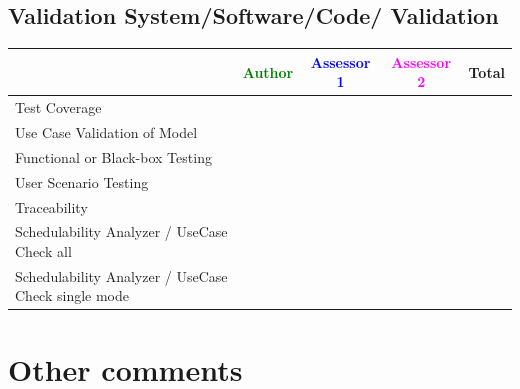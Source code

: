 	
\subsection{Validation System/Software/Code/ Validation	}


\begin{tabular}{|l | c | c | c | c|}
\hline
& \textcolor{green}{Author} & \textcolor{blue}{Assessor 1} & \textcolor{magenta}{Assessor 2} & Total \\
\hline 
Test Coverage & & & &  \\
\hline
Use Case Validation of Model & & & &  \\
\hline
Functional or Black-box Testing & & & &  \\
\hline
User Scenario Testing & & & &  \\
\hline
Traceability & & & &  \\
\hline
Schedulability Analyzer / UseCase Check all & & & &  \\
\hline
Schedulability Analyzer / UseCase Check single mode & & & &  \\
\hline

\end{tabular}



\section{Other comments}

